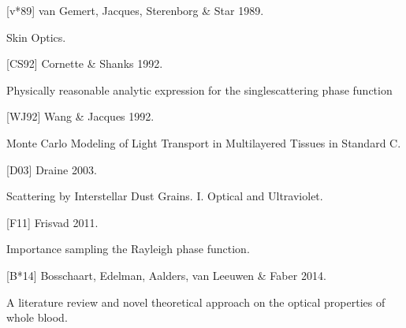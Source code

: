 \documentclass[letterpaper,10pt,english]{sphinxmanual}
\begin{document}
\begin{DUlineblock}{0em}
\item[] {[}v*89{]} van Gemert, Jacques, Sterenborg \& Star 1989.
\item[] Skin Optics.
\item[] 
\end{DUlineblock}

\begin{DUlineblock}{0em}
\item[] {[}CS92{]} Cornette \& Shanks 1992.
\item[] Physically reasonable analytic expression for the single\sphinxhyphen{}scattering phase function
\item[] 
\end{DUlineblock}

\begin{DUlineblock}{0em}
\item[] {[}WJ92{]} Wang \& Jacques 1992.
\item[] Monte Carlo Modeling of Light Transport in Multi\sphinxhyphen{}layered Tissues in Standard C.
\item[] 
\end{DUlineblock}

\begin{DUlineblock}{0em}
\item[] {[}D03{]} Draine 2003.
\item[] Scattering by Interstellar Dust Grains. I. Optical and Ultraviolet.
\item[] 
\end{DUlineblock}

\begin{DUlineblock}{0em}
\item[] {[}F11{]} Frisvad 2011.
\item[] Importance sampling the Rayleigh phase function.
\item[] 
\end{DUlineblock}

\begin{DUlineblock}{0em}
\item[] {[}B*14{]} Bosschaart, Edelman, Aalders, van Leeuwen \& Faber 2014.
\item[] A literature review and novel theoretical approach on the optical properties of whole blood.
\item[] 
\end{DUlineblock}
\end{document}
